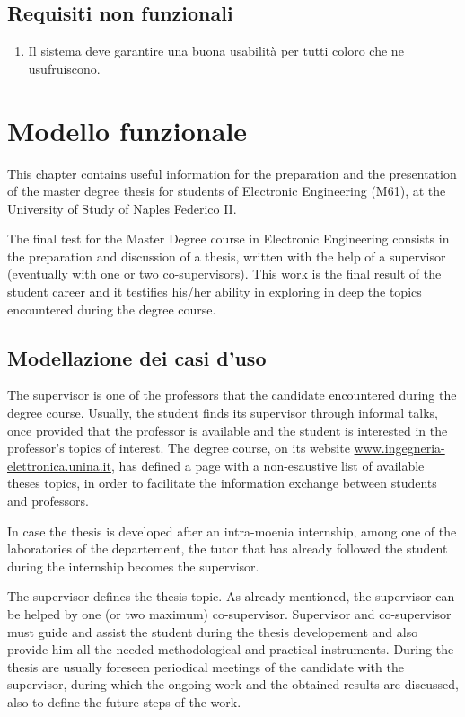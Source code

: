 \section{Requisiti non funzionali}
\begin{enumerate}
    \item Il sistema deve garantire una buona usabilità per tutti coloro che ne usufruiscono.
\end{enumerate}
\chapter{Modello funzionale}

This chapter contains useful information for the preparation and the presentation of the master degree thesis for students of Electronic Engineering (M61), at the University of Study of Naples Federico II.

The final test for the Master Degree course in Electronic Engineering consists in the preparation and discussion of a thesis, written with the help of a supervisor (eventually with one or two co-supervisors). This work is the final result of the student career and it testifies his/her ability in exploring in deep the topics encountered during the degree course.

\section{Modellazione dei casi d'uso}

The supervisor is one of the professors that the candidate encountered during the degree course. Usually, the student finds its supervisor through informal talks, once provided that the professor is available and the student is interested in the professor's topics of interest. The degree course, on its website \url{www.ingegneria-elettronica.unina.it}, has defined a page with a non-esaustive list of available theses topics, in order to facilitate the information exchange between students and professors.

In case the thesis is developed after an intra-moenia internship, among one of the laboratories of the departement, the tutor that has already followed the student during the internship becomes the supervisor.

The supervisor defines the thesis topic. As already mentioned, the supervisor can be helped by one (or two maximum) co-supervisor. Supervisor and co-supervisor must guide and assist the student during the thesis developement and also provide him all the needed methodological and practical instruments. During the thesis are usually foreseen periodical meetings of the candidate with the supervisor, during which the ongoing work and the obtained results are discussed, also to define the future steps of the work.


